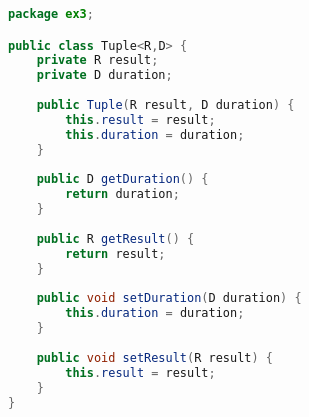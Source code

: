 \begin{lstlisting}[language=java,
    label=lst:tuple,
    caption=TupleClass which is used to return measured time and result of function call
]
package ex3;

public class Tuple<R,D> {
	private R result;
	private D duration;
	
	public Tuple(R result, D duration) {
		this.result = result;
		this.duration = duration;
	}
	
	public D getDuration() {
		return duration;
	}
	
	public R getResult() {
		return result;
	}
	
	public void setDuration(D duration) {
		this.duration = duration;
	}
	
	public void setResult(R result) {
		this.result = result;
	}
}
\end{lstlisting}